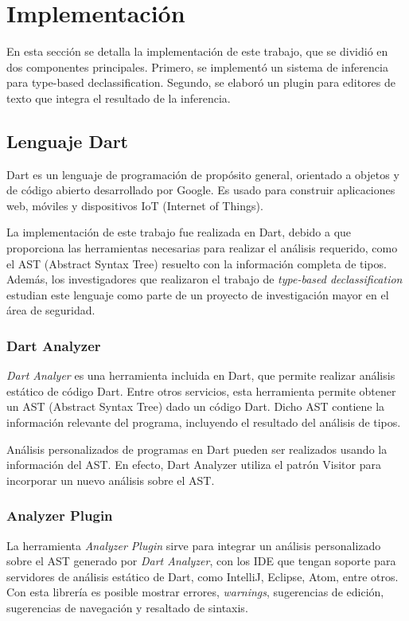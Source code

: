 \chapter{Implementación}
En esta sección se detalla la implementación de este trabajo, que se dividió en dos componentes principales. Primero, se implementó un sistema de inferencia para type-based declassification. Segundo, se elaboró un plugin para editores de texto que integra el resultado de la inferencia.

\section{Lenguaje Dart}
Dart es un lenguaje de programación de propósito general, orientado a objetos y de código abierto desarrollado por Google. Es usado para construir aplicaciones web, móviles y dispositivos IoT (Internet of Things).

La implementación de este trabajo fue realizada en Dart, debido a que proporciona las herramientas necesarias para realizar el análisis requerido, como el AST (Abstract Syntax Tree) resuelto con la información completa de tipos. Además, los investigadores que realizaron el trabajo de \textit{type-based declassification} estudian este lenguaje como parte de un proyecto de investigación mayor en el área de seguridad.

\subsection{Dart Analyzer}
\textit{Dart Analyer} es una herramienta incluida en Dart, que permite realizar análisis estático de código Dart. Entre otros servicios, esta herramienta permite obtener un AST (Abstract Syntax Tree) dado un código Dart. Dicho AST contiene la información relevante del programa, incluyendo el resultado del análisis de tipos.

Análisis personalizados de programas en Dart pueden ser realizados usando la información del AST. En efecto, Dart Analyzer utiliza el patrón Visitor para incorporar un nuevo análisis sobre el AST.

\subsection{Analyzer Plugin}
La herramienta \textit{Analyzer Plugin} sirve para integrar un análisis personalizado sobre el AST generado por \textit{Dart Analyzer}, con los IDE que tengan soporte para servidores de análisis estático de Dart, como IntelliJ, Eclipse, Atom, entre otros. Con esta librería es posible mostrar errores, \textit{warnings}, sugerencias de edición, sugerencias de navegación  y resaltado de sintaxis.

